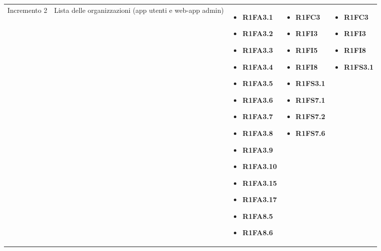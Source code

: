 {\begin{longtable}{C{2.5cm} C{3.2cm} C{2.8cm} C{2.8cm} C{2.8cm}}
Incremento 2 & Lista delle organizzazioni (app utenti e web-app admin) & \begin{itemize}
    \item[ ] \textbf{R1FA3.1}
    \item[ ] \textbf{R1FA3.2}
    \item[ ] \textbf{R1FA3.3}
    \item[ ] \textbf{R1FA3.4}
    \item[ ] \textbf{R1FA3.5}
    \item[ ] \textbf{R1FA3.6}
    \item[ ] \textbf{R1FA3.7}
    \item[ ] \textbf{R1FA3.8}
    \item[ ] \textbf{R1FA3.9}
    \item[ ] \textbf{R1FA3.10}
    \item[ ] \textbf{R1FA3.15}
    \item[ ] \textbf{R1FA3.17}
    \item[ ] \textbf{R1FA8.5}
    \item[ ] \textbf{R1FA8.6}
\end{itemize} & \begin{itemize} 
    \item[ ] \textbf{R1FC3}
    \item[ ] \textbf{R1FI3}
    \item[ ] \textbf{R1FI5}
    \item[ ] \textbf{R1FI8}
    \item[ ] \textbf{R1FS3.1}
    \item[ ] \textbf{R1FS7.1}
    \item[ ] \textbf{R1FS7.2}
    \item[ ] \textbf{R1FS7.6}
\end{itemize} & \begin{itemize} 
    \item[ ] \textbf{R1FC3}
    \item[ ] \textbf{R1FI3}
    \item[ ] \textbf{R1FI8} 
    \item[ ] \textbf{R1FS3.1}
\end{itemize}\\


\end{longtable}}
